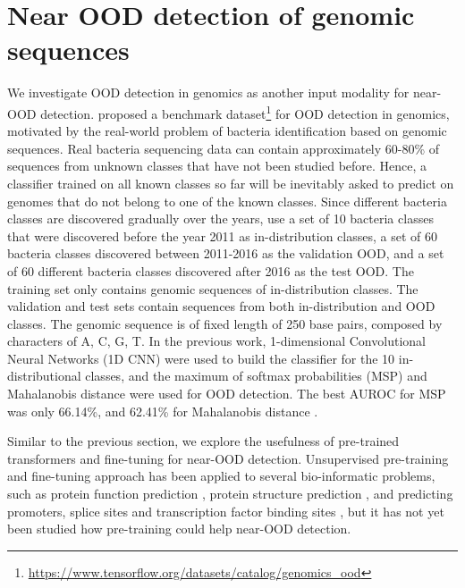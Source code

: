 \documentclass{article}
\begin{document}
\vspace{-1em}
\section{Near OOD detection of genomic sequences}
\vspace{-0.5em}
\label{sec:genomics}
We investigate OOD detection in genomics as another input modality for near-OOD detection. 
\citet{ren2019likelihood} proposed a benchmark dataset\footnote{\url{https://www.tensorflow.org/datasets/catalog/genomics\_ood}} for OOD detection in genomics, motivated by the real-world problem of bacteria identification based on genomic sequences.   
Real bacteria sequencing data can contain approximately 60-80\% of sequences from unknown classes that have not been studied before. Hence, a classifier trained on all known classes so far will be inevitably asked to predict on genomes that do not belong to one of the known classes. 
Since different bacteria classes are discovered gradually over the years, \citet{ren2019likelihood} use a set of 10 bacteria classes that were discovered before the year 2011 as in-distribution classes, a set of 60 bacteria classes discovered between 2011-2016 as the validation OOD, and a set of 60 different bacteria classes discovered after 2016 as the test OOD. 
The training set only contains genomic sequences of in-distribution classes. The validation and test sets contain sequences from both in-distribution and OOD classes. The genomic sequence is of fixed length of 250 base pairs, composed by characters of {A, C, G, T}. 
In the previous work, 1-dimensional Convolutional Neural Networks (1D CNN) were used to build the classifier for the 10 in-distributional classes, and the maximum of softmax probabilities (MSP) and Mahalanobis distance were used for OOD detection. The best AUROC for MSP was only 66.14\%, and 62.41\% for Mahalanobis distance \citep{ren2019likelihood}.

Similar to the previous section, we explore the usefulness of pre-trained transformers and fine-tuning for near-OOD detection.  
Unsupervised pre-training and fine-tuning approach has been applied to several bio-informatic problems, such as protein function prediction \citep{elnaggar2020prottrans, littmann2021embeddings}, protein structure prediction \citep{rives2021biological},
and predicting promoters, splice sites and transcription factor binding sites \citep{ji2020dnabert}, but it has not yet been studied how pre-training could help near-OOD detection.  
\end{document}
